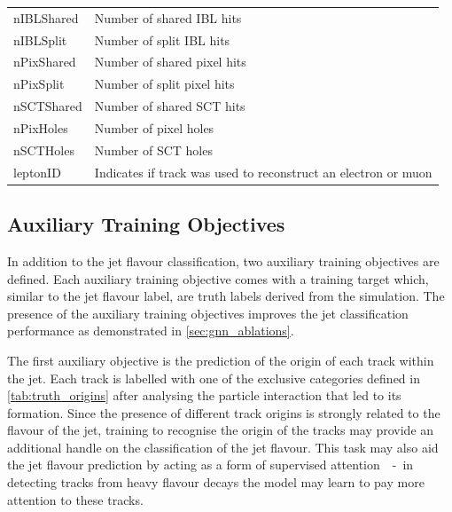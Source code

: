 \begin{table}[!htbp]
\begin{tabular}{ll}
    nIBLShared & Number of shared IBL hits \\
    nIBLSplit  & Number of split IBL hits \\
    nPixShared & Number of shared pixel hits \\
    nPixSplit  & Number of split pixel hits \\
    nSCTShared & Number of shared SCT hits \\
    nPixHoles  & Number of pixel holes \\
    nSCTHoles  & Number of SCT holes \\
    leptonID   & Indicates if track was used to reconstruct an electron or muon \\
    \bottomrule
  \end{tabular}
  \vspace{4mm}
  \label{tab:track_inputs}
\end{table}


\subsection{Auxiliary Training Objectives}\label{sec:aux-train-objectives}

In addition to the jet flavour classification, two auxiliary training objectives are defined.
Each auxiliary training objective comes with a training target which, similar to the jet flavour label, are truth labels derived from the simulation.
The presence of the auxiliary training objectives improves the jet classification performance as demonstrated in \cref{sec:gnn_ablations}.

The first auxiliary objective is the prediction of the origin of each track within the jet. 
Each track is labelled with one of the exclusive categories defined in \cref{tab:truth_origins} after analysing the particle interaction that led to its formation. 
Since the presence of different track origins is strongly related to the flavour of the jet, training \GNN to recognise the origin of the tracks may provide an additional handle on the classification of the jet flavour.
This task may also aid the jet flavour prediction by acting as a form of supervised attention~\cite{arxiv.2007.08294}~-~in detecting tracks from heavy flavour decays the model may learn to pay more attention to these tracks.

